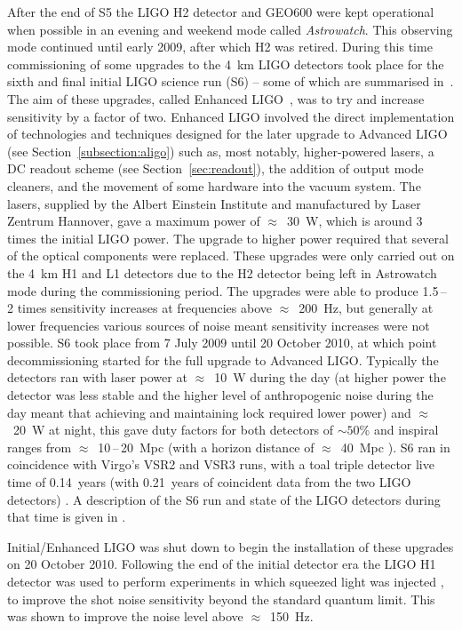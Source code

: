 After the end of S5 the LIGO H2 detector and GEO600 were kept operational when possible in an evening and 
weekend mode called \textit{Astrowatch}. This observing mode continued until early 2009, after which H2 was 
retired. During this time commissioning of some upgrades to the 4~km LIGO detectors took place for the sixth 
and final initial LIGO science run (S6) -- some of which are summarised in~\cite{Whitcomb:2008}. The aim of 
these upgrades, called Enhanced LIGO~\cite{EnhancedLIGO}, was to try and increase sensitivity by a factor of 
two. Enhanced LIGO involved the direct implementation of technologies and techniques designed for the later
upgrade to Advanced LIGO (see Section~\ref{subsection:aligo}) such as, most notably, higher-powered lasers, a 
DC readout scheme (see Section~\ref{sec:readout}), the addition of output mode cleaners, and the movement of 
some hardware into the vacuum system. The lasers, supplied by the Albert Einstein Institute and manufactured 
by Laser Zentrum Hannover, gave a maximum power of $\approx$~30~W, which is around 3 times the initial LIGO 
power. The upgrade to higher power required that several of the optical components were replaced. 
These upgrades were only carried out on the 4~km H1 and L1 detectors due to the H2 detector being left in 
Astrowatch mode during the commissioning period. The upgrades were able to produce 1.5\,--\,2 times 
sensitivity increases at frequencies above $\approx$~200~Hz, but generally at lower frequencies various 
sources of noise meant sensitivity increases were not possible. S6 took place from 7 July 2009
until 20 October 2010, at which point decommissioning started for the full upgrade to Advanced LIGO. 
Typically the detectors ran with laser power at $\approx$~10~W during the day (at higher power the detector
was less stable and the higher level of anthropogenic noise during the day meant that achieving and 
maintaining lock required lower power) and $\approx$~20~W at night, this gave duty factors for both 
detectors of $\sim 50$\% and inspiral ranges from $\approx$~10\,--\,20~Mpc (with a horizon distance of 
$\approx$~40~Mpc \cite{2012PhRvD..85h2002A}). S6 ran in coincidence with Virgo's VSR2 and VSR3 runs, with a 
toal triple detector live time of 0.14~years (with 0.21~years of coincident data from the two LIGO detectors) 
\cite{2012PhRvD..85h2002A}. A description of the S6 run and state of the LIGO detectors during that time is 
given in \cite{2015CQGra..32k5012A}.

Initial/Enhanced LIGO was shut down to begin the installation of these upgrades on 20 October 2010. Following
the end of the initial detector era the LIGO H1 detector was used to perform experiments in which 
squeezed light was injected \cite{2013NaPho...7..613A}, to improve the shot noise sensitivity beyond the 
standard quantum limit. This was shown to improve the noise level above $\approx$~150~Hz.

